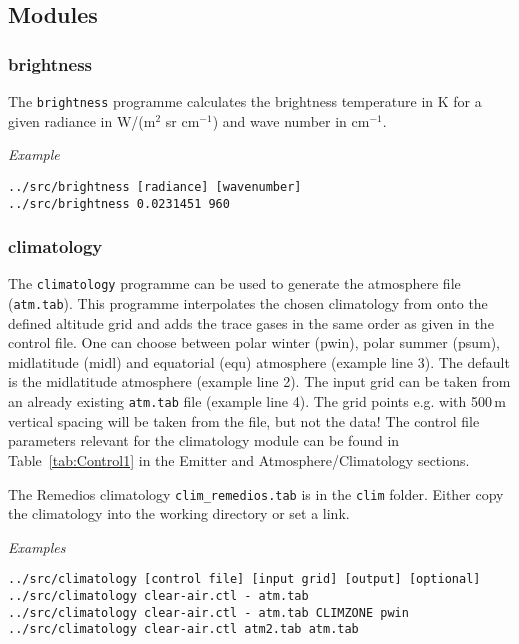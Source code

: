 \subsection{Modules}

\subsubsection{brightness}
The \texttt{brightness} programme calculates the brightness temperature in K for a given radiance in W/(m$^2$ sr cm$^{-1}$) and wave number in cm$^{-1}$.

\emph{Example}\linebreak
\begin{verbatim}
../src/brightness [radiance] [wavenumber]
../src/brightness 0.0231451 960
\end{verbatim}

\subsubsection{climatology}
\label{sec:ModuleClimatology}
The \texttt{climatology} programme can be used to generate the atmosphere file (\texttt{atm.tab}). This programme interpolates the chosen climatology from \citet{Remedios2007} onto the defined altitude grid and adds the trace gases in the same order as given in the control file. One can choose between polar winter (pwin), polar summer (psum), midlatitude (midl) and equatorial (equ) atmosphere (example line 3). The default is the midlatitude atmosphere (example line 2). The input grid can be taken from an already existing \texttt{atm.tab} file (example line 4). The grid points e.g. with 500\,m vertical spacing will be taken from the file, but not the data! The control file parameters relevant for the climatology module can be found in Table~\ref{tab:Control1} in the Emitter and Atmosphere/Climatology sections.

The Remedios climatology \texttt{clim\_remedios.tab} is in the \texttt{clim} folder. Either copy the climatology into the working directory or set a link.

\emph{Examples}\linebreak
\begin{verbatim}
../src/climatology [control file] [input grid] [output] [optional]
../src/climatology clear-air.ctl - atm.tab
../src/climatology clear-air.ctl - atm.tab CLIMZONE pwin
../src/climatology clear-air.ctl atm2.tab atm.tab
\end{verbatim}

